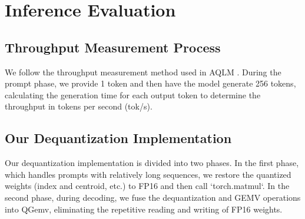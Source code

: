 \section{Inference Evaluation}
\subsection{Throughput Measurement Process}
We follow the throughput measurement method used in AQLM \cite{AQLM}. During the prompt phase, we provide 1 token and then have the model generate 256 tokens, calculating the generation time for each output token to determine the throughput in tokens per second (tok/s).

\subsection{Our Dequantization Implementation}
Our dequantization implementation is divided into two phases. In the first phase, which handles prompts with relatively long sequences, we restore the quantized weights (index and centroid, etc.) to FP16 and then call `torch.matmul`.  In the second phase, during decoding, we fuse the dequantization and GEMV operations into QGemv, eliminating the repetitive reading and writing of FP16 weights.
